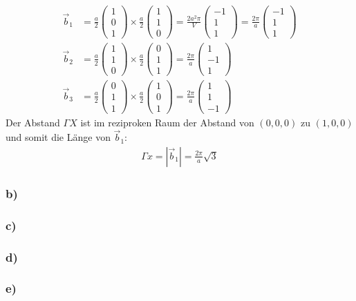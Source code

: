\begin{align*}
\vec{b}_1 &= \frac{a}{2}\begin{pmatrix}1\\0\\1\end{pmatrix}\times\frac{a}{2}\begin{pmatrix}1\\1\\0\end{pmatrix} = \frac{2a^2\pi}{V}\begin{pmatrix}-1\\1\\1\end{pmatrix} = \frac{2\pi}{a}\begin{pmatrix}-1\\1\\1\end{pmatrix} \\
\vec{b}_2 &= \frac{a}{2}\begin{pmatrix}1\\1\\0\end{pmatrix}\times\frac{a}{2}\begin{pmatrix}0\\1\\1\end{pmatrix} = \frac{2\pi}{a}\begin{pmatrix}1\\-1\\1\end{pmatrix}\\
\vec{b}_3 &= \frac{a}{2}\begin{pmatrix}0\\1\\1\end{pmatrix}\times\frac{a}{2}\begin{pmatrix}1\\0\\1\end{pmatrix} = \frac{2\pi}{a}\begin{pmatrix}1\\1\\-1\end{pmatrix}
\end{align*}
Der Abstand $\Gamma X$ ist im reziproken Raum der Abstand von $(0,0,0)$ zu $(1,0,0)$ und somit die Länge von $\vec{b}_1$:
\begin{align*}
\Gamma x = |\vec{b}_1| = \frac{2\pi}{a}\sqrt{3}
\end{align*}

\subsubsection*{b)}

\subsubsection*{c)}

\subsubsection*{d)}

\subsubsection*{e)}
